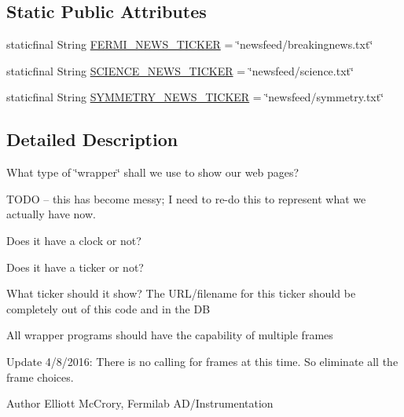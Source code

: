 \subsection*{Static Public Attributes}
\begin{DoxyCompactItemize}
\item 
staticfinal String \hyperlink{enumgov_1_1fnal_1_1ppd_1_1dd_1_1display_1_1client_1_1WrapperType_a0f5ba15d79a2ff5499439b7b5316dff6}{F\-E\-R\-M\-I\-\_\-\-N\-E\-W\-S\-\_\-\-T\-I\-C\-K\-E\-R} = \char`\"{}newsfeed/breakingnews.\-txt\char`\"{}
\item 
staticfinal String \hyperlink{enumgov_1_1fnal_1_1ppd_1_1dd_1_1display_1_1client_1_1WrapperType_a49f9c66d29be47efc42ef65755518d1b}{S\-C\-I\-E\-N\-C\-E\-\_\-\-N\-E\-W\-S\-\_\-\-T\-I\-C\-K\-E\-R} = \char`\"{}newsfeed/science.\-txt\char`\"{}
\item 
staticfinal String \hyperlink{enumgov_1_1fnal_1_1ppd_1_1dd_1_1display_1_1client_1_1WrapperType_ae9463619bd0d0484acef13fda6ef15f3}{S\-Y\-M\-M\-E\-T\-R\-Y\-\_\-\-N\-E\-W\-S\-\_\-\-T\-I\-C\-K\-E\-R} = \char`\"{}newsfeed/symmetry.\-txt\char`\"{}
\end{DoxyCompactItemize}


\subsection{Detailed Description}
What type of \char`\"{}wrapper\char`\"{} shall we use to show our web pages?

T\-O\-D\-O -- this has become messy; I need to re-\/do this to represent what we actually have now. 
\begin{DoxyEnumerate}
\item Does it have a clock or not? 
\item Does it have a ticker or not? 
\item What ticker should it show? The U\-R\-L/filename for this ticker should be completely out of this code and in the D\-B 
\end{DoxyEnumerate}

All wrapper programs should have the capability of multiple frames 

Update 4/8/2016\-: There is no calling for frames at this time. So eliminate all the frame choices. 

\begin{DoxyAuthor}{Author}
Elliott Mc\-Crory, Fermilab A\-D/\-Instrumentation 
\end{DoxyAuthor}


